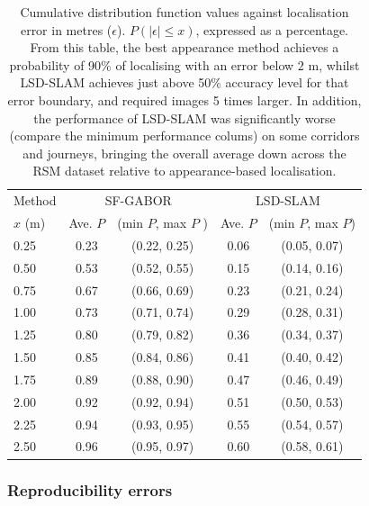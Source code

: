 \begin{table}
\caption{Cumulative distribution function values against localisation error in metres ($\epsilon$). $P(|\epsilon| \leq x)$, expressed as a percentage. From this table, the best appearance method achieves a probability of 90\% of localising with an error below $2$ m, whilst LSD-SLAM achieves just above 50\% accuracy level for that error boundary, and required images 5 times larger. In addition, the performance of LSD-SLAM was significantly worse (compare the minimum performance colums) on some corridors and journeys, bringing the overall average down across the RSM dataset relative to appearance-based localisation.}
\label{tbl:cdftable}
\centering
    \begin{tabular}{lcccc}
    \toprule
    Method & 
    \multicolumn{2}{c}{SF-GABOR} &
    \multicolumn{2}{c}{LSD-SLAM} \\

    $x$ (m) & Ave. $P$  & (min $P$, max $P$ ) & Ave. $P$ & (min $P$, max $P$) \\
    \midrule
    0.25 & 0.23 & (0.22, 0.25) & 0.06 & (0.05, 0.07)  \\
    0.50 & 0.53 & (0.52, 0.55) & 0.15 & (0.14, 0.16) \\
    0.75 & 0.67 & (0.66, 0.69) & 0.23 & (0.21, 0.24) \\
    1.00 & 0.73 & (0.71, 0.74) & 0.29 & (0.28, 0.31)\\
    1.25 & 0.80 & (0.79, 0.82) & 0.36 & (0.34, 0.37)\\
    1.50 & 0.85 & (0.84, 0.86) & 0.41 & (0.40, 0.42) \\
    1.75 & 0.89 & (0.88, 0.90) & 0.47 & (0.46, 0.49) \\
    2.00 & 0.92 & (0.92, 0.94) & 0.51 & (0.50, 0.53)  \\
    2.25 & 0.94 & (0.93, 0.95) & 0.55 & (0.54, 0.57) \\
    2.50 & 0.96 & (0.95, 0.97)  & 0.60 & (0.58, 0.61) \\
    \bottomrule
    \end{tabular}
\end{table}


\subsubsection{Reproducibility errors}

